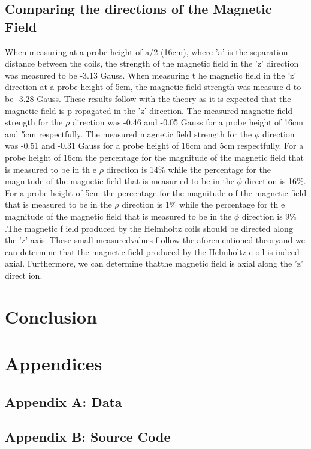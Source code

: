 \documentclass[a4paper]{article}
\begin{document}

\subsection{Comparing the directions of the Magnetic Field}

\qq When measuring at a probe height of a/2 (16cm), where 'a' is the separation
distance between the coils, the strength of the magnetic field in the 'z'
direction was measured to be -3.13 Gauss. When measuring t he magnetic field in
the 'z' direction at a probe height of 5cm, the magnetic field strength was
measure d to be -3.28 Gauss. These results follow with the theory as it is
expected that the magnetic field is p ropagated in the 'z' direction. The
measured magnetic field strength for the $\rho$ direction was -0.46 and -0.05
Gauss for a probe height of 16cm and 5cm respectfully. The measured magnetic
field strength for the $\phi$ direction was -0.51 and -0.31 Gauss for a probe
height of 16cm and 5cm respectfully. For a probe height of 16cm the percentage
for the magnitude of the magnetic field that is measured to be in th e $\rho$
direction is 14$\%$ while the percentage for the magnitude of the magnetic field
that is measur ed to be in the $\phi$ direction is 16$\%$. For a probe height of
5cm the percentage for the magnitude o f the magnetic field that is measured to
be in the $\rho$ direction is 1$\%$ while the percentage for th e magnitude of
the magnetic field that is measured to be in the $\phi$ direction is 9$\%$.The
magnetic f ield produced by the Helmholtz coils should be directed along the 'z'
axis. These small measuredvalues f ollow the aforementioned theoryand we can
determine that the magnetic field produced by the Helmholtz c oil is indeed
axial. Furthermore, we can determine thatthe magnetic field is axial along the
'z' direct ion.

\section{Conclusion}

\section{Appendices}

\subsection{Appendix A: Data}

\subsection{Appendix B: Source Code}

\inputminted{julia}{BiotSavartTheoretical.jl}

\inputminted{julia}{BiotSavartExperimental.jl}

\inputminted{julia}{TheoreticalVsExperimental.jl}
\end{document}
